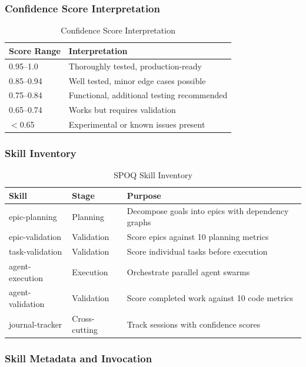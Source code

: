 \subsubsection{Confidence Score Interpretation}

\begin{table}[htbp]
\centering
\caption{Confidence Score Interpretation}
\label{tab:confidence}
\small
\begin{tabular}{ll}
\toprule
\textbf{Score Range} & \textbf{Interpretation} \\
\midrule
0.95--1.0 & Thoroughly tested, production-ready \\
0.85--0.94 & Well tested, minor edge cases possible \\
0.75--0.84 & Functional, additional testing recommended \\
0.65--0.74 & Works but requires validation \\
$<$0.65 & Experimental or known issues present \\
\bottomrule
\end{tabular}
\end{table}

\needspace{4cm}
\subsubsection{Skill Inventory}

\begin{table}[htbp]
\centering
\caption{SPOQ Skill Inventory}
\label{tab:skills}
\small
\begin{tabular}{llp{5cm}}
\toprule
\textbf{Skill} & \textbf{Stage} & \textbf{Purpose} \\
\midrule
epic-planning & Planning & Decompose goals into epics with dependency graphs \\
epic-validation & Validation & Score epics against 10 planning metrics \\
task-validation & Validation & Score individual tasks before execution \\
agent-execution & Execution & Orchestrate parallel agent swarms \\
agent-validation & Validation & Score completed work against 10 code metrics \\
journal-tracker & Cross-cutting & Track sessions with confidence scores \\
\bottomrule
\end{tabular}
\end{table}

\subsubsection{Skill Metadata and Invocation}

